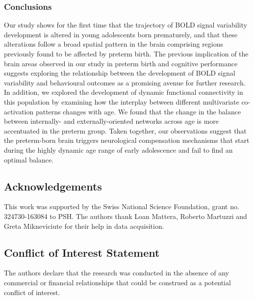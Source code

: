 \subsubsection*{Conclusions}
Our study shows for the first time that the trajectory of BOLD signal variability development is altered in young adolescents born prematurely, and that these alterations follow a broad spatial pattern in the brain comprising regions previously found to be affected by preterm birth. The previous implication of the brain areas observed in our study in preterm birth and cognitive performance suggests exploring the relationship between the development of BOLD signal variability and behavioural outcomes as a promising avenue for further research. In addition, we explored the development of dynamic functional connectivity in this population by examining how the interplay between different multivariate co-activation patterns changes with age. We found that the change in the balance between  internally- and externally-oriented networks across age is more accentuated in the preterm group. Taken together, our observations suggest that the preterm-born brain triggers neurological compensation mechanisms that start during the highly dynamic age range of early adolescence and fail to find an optimal balance. 





\subsection*{Acknowledgements}
This work was supported by the Swiss National Science Foundation, grant no. 324730-163084 to PSH. The authors thank Loan Mattera, Roberto Martuzzi and Greta Mikneviciute for their help in data acquisition. 

\subsection*{Conflict of Interest Statement}
The authors declare that the research was conducted in the absence of any commercial or financial relationships that could be construed as a potential conflict of interest.








